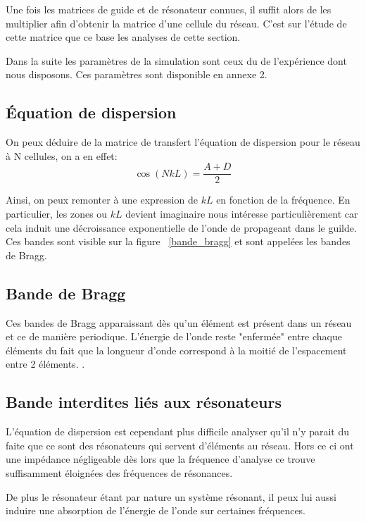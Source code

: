 Une fois les matrices de guide et de résonateur connues, il suffit alors de les multiplier afin d'obtenir la matrice d'une cellule du réseau. C'est sur l'étude de cette matrice que ce base les analyses de cette section. 

Dans la suite les paramètres de la simulation sont ceux du de l'expérience dont nous disposons. Ces paramètres sont disponible en annexe 2.

\subsection{Équation de dispersion}
On peux déduire de la matrice de transfert l'équation de dispersion pour le réseau à N cellules, on a en effet:
\begin{equation}
\cos(NkL) = \frac{A+D}{2} 
\end{equation}

Ainsi, on peux remonter à une expression de $kL$ en fonction de la fréquence. En particulier, les zones ou $kL$ devient imaginaire nous intéresse particulièrement car cela induit une décroissance exponentielle de l'onde de propageant dans le guilde. Ces bandes sont visible sur la figure ~\ref{bande_bragg} et sont appelées les bandes de Bragg.


\subsection{Bande de Bragg}
Ces bandes de Bragg apparaissant dès qu'un élément est présent dans un réseau et ce de manière periodique. L'énergie de l'onde reste "enfermée" entre chaque éléments du fait que la longueur d'onde correspond à la moitié de l'espacement entre 2 éléments.  .
 

\subsection{Bande interdites liés aux résonateurs}
L'équation de dispersion est cependant plus difficile analyser qu'il n'y parait du faite que ce sont des résonateurs qui servent d’éléments au réseau. Hors ce ci ont une impédance négligeable dès lors que la fréquence d'analyse ce trouve suffisamment éloignées des fréquences de résonances. 

De plus le résonateur étant par nature un système résonant, il peux lui aussi induire une absorption de l'énergie de l'onde sur certaines fréquences.

